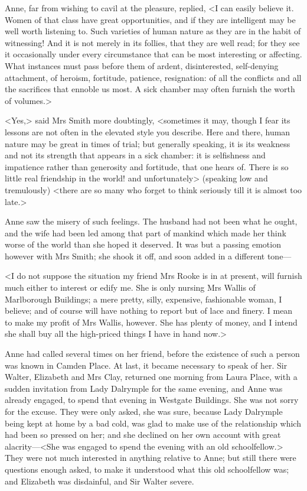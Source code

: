Anne, far from wishing to cavil at the pleasure, replied, <I can easily believe it. Women of that class have great opportunities, and if they are intelligent may be well worth listening to. Such varieties of human nature as they are in the habit of witnessing! And it is not merely in its follies, that they are well read; for they see it occasionally under every circumstance that can be most interesting or affecting. What instances must pass before them of ardent, disinterested, self-denying attachment, of heroism, fortitude, patience, resignation: of all the conflicts and all the sacrifices that ennoble us most. A sick chamber may often furnish the worth of volumes.>

<Yes,> said Mrs Smith more doubtingly, <sometimes it may, though I fear its lessons are not often in the elevated style you describe. Here and there, human nature may be great in times of trial; but generally speaking, it is its weakness and not its strength that appears in a sick chamber: it is selfishness and impatience rather than generosity and fortitude, that one hears of. There is so little real friendship in the world! and unfortunately> (speaking low and tremulously) <there are so many who forget to think seriously till it is almost too late.>

Anne saw the misery of such feelings. The husband had not been what he ought, and the wife had been led among that part of mankind which made her think worse of the world than she hoped it deserved. It was but a passing emotion however with Mrs Smith; she shook it off, and soon added in a different tone—

<I do not suppose the situation my friend Mrs Rooke is in at present, will furnish much either to interest or edify me. She is only nursing Mrs Wallis of Marlborough Buildings; a mere pretty, silly, expensive, fashionable woman, I believe; and of course will have nothing to report but of lace and finery. I mean to make my profit of Mrs Wallis, however. She has plenty of money, and I intend she shall buy all the high-priced things I have in hand now.>

Anne had called several times on her friend, before the existence of such a person was known in Camden Place. At last, it became necessary to speak of her. Sir Walter, Elizabeth and Mrs Clay, returned one morning from Laura Place, with a sudden invitation from Lady Dalrymple for the same evening, and Anne was already engaged, to spend that evening in Westgate Buildings. She was not sorry for the excuse. They were only asked, she was sure, because Lady Dalrymple being kept at home by a bad cold, was glad to make use of the relationship which had been so pressed on her; and she declined on her own account with great alacrity—<She was engaged to spend the evening with an old schoolfellow.> They were not much interested in anything relative to Anne; but still there were questions enough asked, to make it understood what this old schoolfellow was; and Elizabeth was disdainful, and Sir Walter severe.

